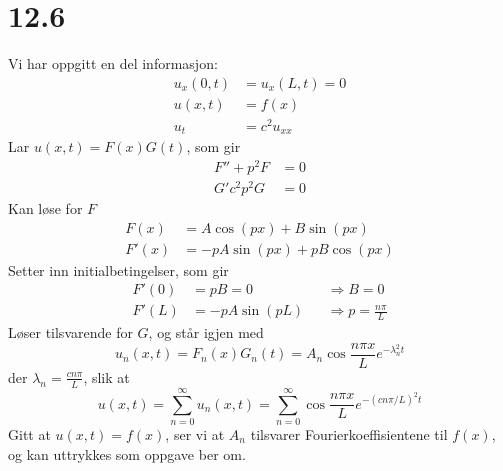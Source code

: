 \documentclass[11pt, a4paper, norsk]{NTNUoving}
\begin{document}
\section*{12.6}
\begin{oppgave}[11]
  Vi har oppgitt en del informasjon:
  \begin{align*}
    u_x(0,t) &= u_x(L, t) = 0 \\
    u(x, t) &= f(x) \\
    u_t &= c^2 u_{xx}
  \end{align*}
  Lar $u(x,t) = F(x)G(t)$, som gir
  \begin{align*}
    F''+p^2F &= 0 \\
    G' c^2 p^2 G &= 0
  \end{align*}
  Kan løse for $F$
  \begin{align*}
    F(x) &= A\cos(px)+B\sin(px) \\
    F'(x) &= -pA\sin(px)+pB\cos(px)
  \end{align*} 
  Setter inn initialbetingelser, som gir
  \begin{align*}
    F'(0) &= pB = 0 && \Rightarrow B = 0 \\
    F'(L) &= -pA\sin(pL) && \Rightarrow p = \frac{n\pi}{L}
  \end{align*} 
  Løser tilsvarende for $G$, og står igjen med 
  \[
    u_n(x,t) = F_n(x)G_n(t)=A_n\cos\frac{n\pi x}{L} e^{-\lambda_n^2t}
  \]
  der $\lambda_n = \frac{c n \pi}{L}$, slik at
  \[
    u(x,t) = \sum_{n=0}^\infty u_n(x,t)
    = \sum_{n=0}^\infty \cos\frac{n\pi x}{L} e^{-(cn\pi/L)^2t}
  \]  
  Gitt at $u(x,t)=f(x)$, ser vi at $A_n$ tilsvarer Fourierkoeffisientene til $f(x)$, og kan uttrykkes som oppgave ber om. 
\end{oppgave}
\newpage
\end{document}
